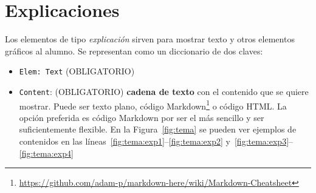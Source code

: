 \documentclass[]{article}
\newcommand{\code}[1]{{\lstinline[basicstyle=\ttfamily,mathescape]!#1!}}
\begin{document}
\section{Explicaciones}\label{sec:explicaciones}
Los elementos de tipo \emph{explicación} sirven para mostrar texto y otros elementos gráficos al alumno. Se representan como un diccionario de dos claves:
\begin{itemize}
	 \item \code{Elem: Text} {\sf (OBLIGATORIO)}
	 \item \code{Content}: {\sf (OBLIGATORIO)} \textbf{cadena de texto} con el contenido que se quiere mostrar. Puede ser texto plano, código Markdown\footnote{\url{https://github.com/adam-p/markdown-here/wiki/Markdown-Cheatsheet}} o código HTML. La opción preferida es código Markdown por ser el más sencillo y ser suficientemente flexible. En la Figura~\ref{fig:tema} se pueden ver ejemplos de contenidos en las líneas~\ref{fig:tema:exp1}--\ref{fig:tema:exp2} y~\ref{fig:tema:exp3}--\ref{fig:tema:exp4}
\end{itemize}
\end{document}
